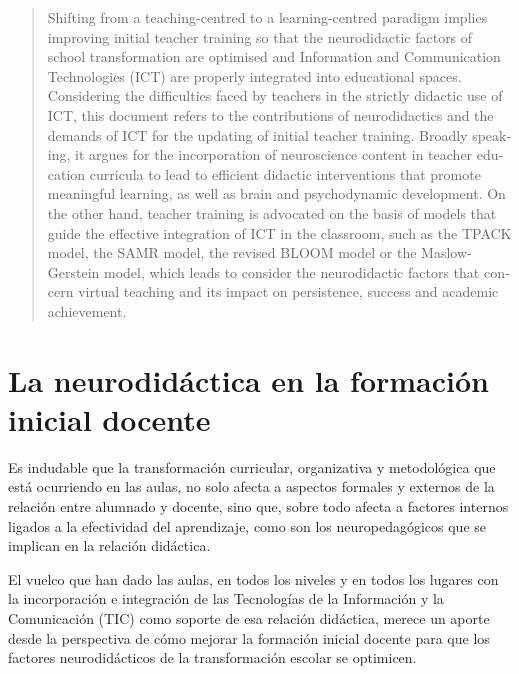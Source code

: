 \documentclass[spanish]{textolivre}
\begin{document}
\begin{polyabstract}
\begin{portuguese}
\begin{abstract}
\end{abstract}
\end{portuguese}

\begin{english}
\begin{abstract}
Shifting from a teaching-centred to a learning-centred paradigm implies improving initial teacher training so that the neurodidactic factors of school transformation are optimised and Information and Communication Technologies (ICT) are properly integrated into educational spaces. Considering the difficulties faced by teachers in the strictly didactic use of ICT, this document refers to the contributions of neurodidactics and the demands of ICT for the updating of initial teacher training. Broadly speaking, it argues for the incorporation of neuroscience content in teacher education curricula to lead to efficient didactic interventions that promote meaningful learning, as well as brain and psychodynamic development. On the other hand, teacher training is advocated on the basis of models that guide the effective integration of ICT in the classroom, such as the TPACK model, the SAMR model, the revised BLOOM model or the Maslow-Gerstein model, which leads to consider the neurodidactic factors that concern virtual teaching and its impact on persistence, success and academic achievement.

\end{abstract}
\end{english}
\end{polyabstract}

\section{La neurodidáctica en la formación inicial docente}\label{sec-intro}
Es indudable que la transformación curricular, organizativa y metodológica que está ocurriendo en las aulas, no solo afecta a aspectos formales y externos de la relación entre alumnado y docente, sino que, sobre todo afecta a factores internos ligados a la efectividad del aprendizaje, como son los neuropedagógicos que se implican en la relación didáctica.

El vuelco que han dado las aulas, en todos los niveles y en todos los lugares con la incorporación e integración de las Tecnologías de la Información y la Comunicación (TIC) como soporte de esa relación didáctica, merece un aporte desde la perspectiva de cómo mejorar la formación inicial docente para que los factores neurodidácticos de la transformación escolar se optimicen.
\end{document}
